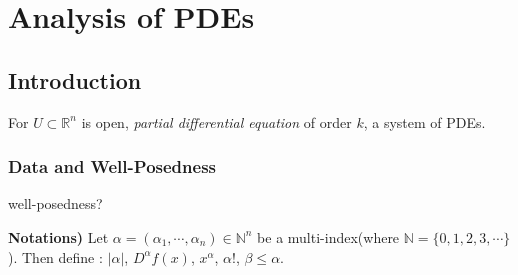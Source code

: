 \documentclass[10pt,a4paper]{report}
\DeclarePairedDelimiter\bignorm{\lVert}{\rVert}
\newcommand{\doublerule}[1][.4pt]{%
  \noindent
  \makebox[0pt][l]{\rule[.7ex]{\linewidth}{#1}}%
  \rule[.3ex]{\linewidth}{#1}}
\begin{document}
\newcommand{\thm}{\textbf{Theorem) }}
\newcommand{\thmnum}[1]{\textbf{Theorem #1) }}
\newcommand{\defi}{\textbf{Definition) }}
\newcommand{\definum}[1]{\textbf{Definition #1) }}
\newcommand{\lem}{\textbf{Lemma) }}
\newcommand{\lemnum}[1]{\textbf{Lemma #1) }}
\newcommand{\prop}{\textbf{Proposition) }}
\newcommand{\propnum}[1]{\textbf{Proposition #1) }}
\newcommand{\corr}{\textbf{Corollary) }}
\newcommand{\corrnum}[1]{\textbf{Corollary #1) }}
\newcommand{\pf}{\textbf{proof) }}

\newcommand{\lap}{\triangle} %
\newcommand{\s}{\vspace{10pt}}
\newcommand{\reals}{\mathbb{R}}

\newcommand{\eop}{\hfill  \textsl{(End of proof)} $\square$} %
\newcommand{\eos}{\hfill  \textsl{(End of statement)} $\square$} %


\newcommand{\intN}{\mathbb{Z}_N}
\newcommand{\nat}{\mathbb{N}}
\newcommand{\norms}[2]{\bignorm[\big]{#1}_{#2}}
\newcommand{\abs}[1]{\big| #1 \big|}
\newcommand{\avg}{\mathbb{E}}
\newcommand{\prob}{\mathbb{P}}
\newcommand{\borel}{\mathscr{B}}
\newcommand{\EE}{\mathscr{E}}
\newcommand{\pa}{\partial}

\renewcommand{\vec}{\underline}
\renewcommand{\bar}{\overline}

\def\doubleunderline#1{\underline{\underline{#1}}}

\newcommand{\newday}{\doublerule[0.5pt]}

\setlength\parindent{0pt}

\chapter*{Analysis of PDEs}
\s

\section*{Introduction}

For $U \subset \reals^n$ is open, \emph{partial differential equation} of order $k$, a system of PDEs.
\s

\subsection*{Data and Well-Posedness}

well-posedness?
\s

\textbf{Notations) } Let $\alpha = (\alpha_1, \cdots, \alpha_n) \in \mathbb{N}^n$ be a multi-index(where $\mathbb{N} =\{ 0,1,2,3,\cdots\}$). Then define : $|\alpha|$, $D^{\alpha}f(x)$, $x^{\alpha}$, $\alpha!$, $\beta \leq \alpha$.
\s
\end{document}
